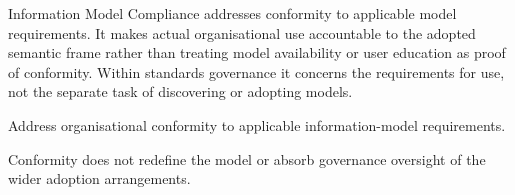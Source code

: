 Information Model Compliance addresses conformity to applicable model requirements. It makes actual organisational use accountable to the adopted semantic frame rather than treating model availability or user education as proof of conformity. Within standards governance it concerns the requirements for use, not the separate task of discovering or adopting models.



Address organisational conformity to applicable information-model requirements.



Conformity does not redefine the model or absorb governance oversight of the wider adoption arrangements.


